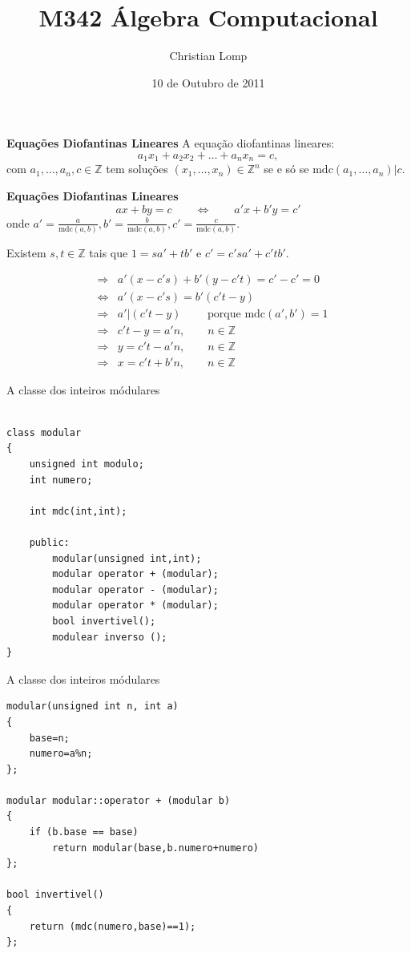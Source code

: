 \documentclass{beamer}
\title[M342]{M342 Álgebra Computacional}
\author{Christian Lomp}
\institute{FCUP}
\date{10 de Outubro de 2011}
\newcommand{\ZZ}{\mathbb Z}
\newcommand{\mdc}[2]{\mathrm{mdc}({#1}, {#2})}
\begin{document}
\begin{frame}
\titlepage
\end{frame}






\begin{frame}{\bf Equações Diofantinas Lineares}
A equação diofantinas lineares:
$$ a_1x_1 + a_2x_2 + \ldots + a_n x_n = c,$$
com $a_1, \ldots, a_n, c \in \ZZ$ tem soluções $(x_1, \ldots, x_n)\in \ZZ^n$ se e só se $\mathrm{mdc}(a_1,\ldots, a_n) | c$.
\end{frame}

\begin{frame}{\bf Equações Diofantinas Lineares}
$$ax+by=c\qquad \Leftrightarrow \qquad a'x+b'y = c'$$
onde $a'=\frac{a}{\mdc{a}{b}}, b'=\frac{b}{\mdc{a}{b}}, c'=\frac{c}{\mdc{a}{b}}$.

Existem $s,t\in \ZZ$ tais que $1=sa'+tb'$ e $c'=c'sa'+c'tb'$.

\begin{eqnarray*}
&\Rightarrow &a'(x-c's)+b'(y-c't) = c'-c'=0\\
&\Leftrightarrow& a'(x-c's)=b'(c't-y) \\
&\Rightarrow& a' | (c't-y) \qquad \mbox{ porque } \mdc{a'}{b'}=1\\
&\Rightarrow& c't-y = a'n, \qquad n\in \ZZ \\
&\Rightarrow& y = c't-a'n, \qquad n\in \ZZ \\
&\Rightarrow& x = c't+b'n, \qquad n\in \ZZ
\end{eqnarray*}
\end{frame}

\begin{frame}[fragile]{A classe dos inteiros módulares}
\lstset{language=C++}
\begin{lstlisting}

class modular
{
	unsigned int modulo;
	int numero;
	
	int mdc(int,int);
	
	public: 
		modular(unsigned int,int);
		modular operator + (modular);
		modular operator - (modular);
		modular operator * (modular);
		bool invertivel();
		modulear inverso ();
}
\end{lstlisting}
\end{frame}

\begin{frame}[fragile]{A classe dos inteiros módulares}
\lstset{language=C++,basicstyle=\tiny}
\begin{lstlisting}
modular(unsigned int n, int a)
{
	base=n;
	numero=a%n;
};

modular modular::operator + (modular b)
{
	if (b.base == base) 
		return modular(base,b.numero+numero)
};

bool invertivel()
{
	return (mdc(numero,base)==1);
};

\end{lstlisting}
\end{frame}
\end{document}
